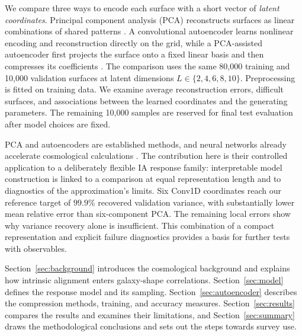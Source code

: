 We compare three ways to encode each surface with a short vector of
\emph{latent coordinates}. Principal component analysis (PCA) reconstructs
surfaces as linear combinations of shared patterns
\citep{2016RSPTA.37450202J}. A convolutional autoencoder learns nonlinear
encoding and reconstruction directly on the grid, while a PCA-assisted
autoencoder first projects the surface onto a fixed linear basis and then
compresses its coefficients \citep{2006Sci...313..504H}. The comparison uses
the same 80,000 training and 10,000 validation surfaces at latent dimensions
$L\in\{2,4,6,8,10\}$. Preprocessing is fitted on training data. We examine
average reconstruction errors, difficult surfaces, and associations between
the learned coordinates and the generating parameters. The remaining
10,000 samples are reserved for final test evaluation after model choices
are fixed.

PCA and autoencoders are established methods, and neural networks already
accelerate cosmological calculations \citep{2022MNRAS.511.1771S}. The
contribution here is their controlled application to a deliberately flexible
IA response family: interpretable model construction is linked to a
comparison at equal representation length and to diagnostics of the
approximation's limits. Six Conv1D coordinates reach our reference target
of $99.9\%$ recovered validation variance, with substantially lower mean
relative error than six-component PCA. The remaining local errors show why
variance recovery alone is insufficient. This combination of a compact
representation and explicit failure diagnostics provides a basis for
further tests with observables.

Section~\ref{sec:background} introduces the cosmological background and
explains how intrinsic alignment enters galaxy-shape correlations.
Section~\ref{sec:model} defines the response model and its sampling.
Section~\ref{sec:autoencoder} describes the compression methods, training,
and accuracy measures. Section~\ref{sec:results} compares the results and
examines their limitations, and Section~\ref{sec:summary} draws the
methodological conclusions and sets out the steps towards survey use.
